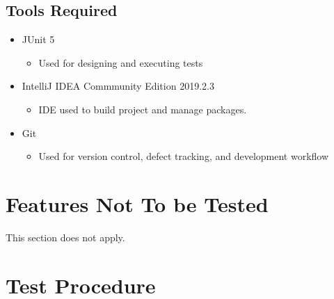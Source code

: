 \documentclass{article}
\begin{document}
    \subsection{Tools Required}
    \begin{itemize}
        \item JUnit 5
        \begin{itemize}
            \item Used for designing and executing tests
        \end{itemize}
        \item IntelliJ IDEA Commmunity Edition 2019.2.3
        \begin{itemize}
            \item IDE used to build project and manage packages.
        \end{itemize}
        \item Git
        \begin{itemize}
            \item Used for version control, defect tracking, and development workflow
        \end{itemize}
    \end{itemize}
    
\section{Features Not To be Tested}
\parargraph{}
This section does not apply.

\section{Test Procedure}
\end{document}
